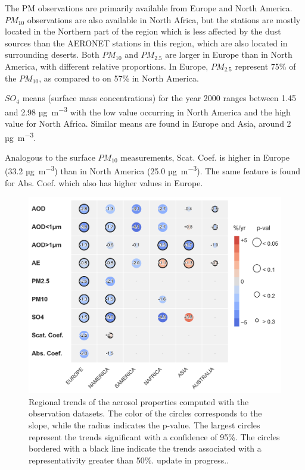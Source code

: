 \documentclass[journal abbreviation, manuscript]{copernicus}
\begin{document}
The PM observations are primarily available from Europe and North America. $PM_{10}$ observations are also available in North Africa, but the stations are mostly located in the Northern part of the region which is less affected by the dust sources than the AERONET stations in this region, which are also located in surrounding deserts. Both $PM_{10}$ and $PM_{2.5}$ are larger in Europe than in North America, with different relative proportions. In Europe, $PM_{2.5}$ represent 75\% of the $PM_{10}$, as compared to on 57\% in North America.

$SO_{4}$ means (surface mass concentrations) for the year 2000 ranges between 1.45 and 2.98 \unit{µg.m^{-3}} with the low value occurring in North America and the high value for North Africa. Similar means are found in Europe and Asia, around 2 \unit{µg.m^{-3}}.

Analogous to the surface $PM_{10}$ measurements, Scat. Coef. is higher in Europe (33.2 \unit{µg.m^{-3}}) than in North America (25.0 \unit{µg.m^{-3}}). The same feature is found for Abs. Coef. which also has higher values in Europe.

\begin{figure}[t]
 \includegraphics[width=12cm]{../scripts/figs/heatmaps/OBS.png}
 \caption{Regional trends of the aerosol properties computed with the observation datasets. The color of the circles corresponds to the slope, while the radius indicates the p-value. The largest circles represent the trends significant with a confidence of 95\%. The circles bordered with a black line indicate the trends associated with a representativity greater than 50\%. update in progress..}
 \label{fig:obs_trends}
\end{figure}
\end{document}
